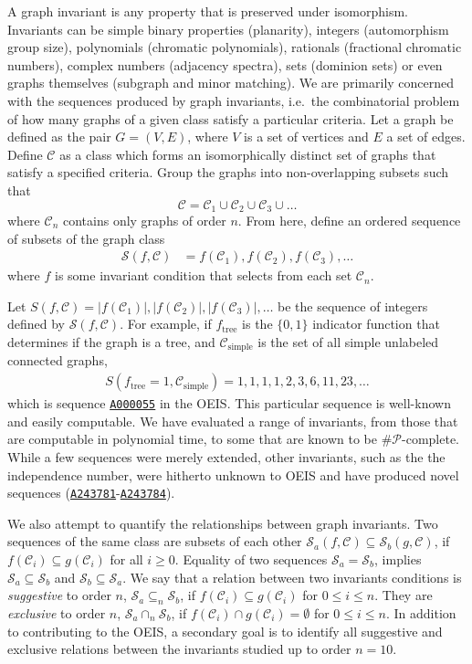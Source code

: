 \documentclass[12pt]{article}
\newcommand{\OEIS}[1]
{\href{https://oeis.org/#1}{\texttt{#1}}}
\newcommand{\SEQ}{\mathcal{S}}
\newcommand{\CLASS}{\mathcal{C}}
\newcommand{\SIMPLECLASS}{\mathcal{C}_\text{simple}}
\newcommand{\ie}[0]{i.e.\ }
\begin{document}
A graph invariant is any property that is preserved under isomorphism. 
Invariants can be simple binary properties (planarity), integers (automorphism group size), polynomials (chromatic polynomials), rationals (fractional chromatic numbers), complex numbers (adjacency spectra), sets (dominion sets) or even graphs themselves (subgraph and minor matching). 
We are primarily concerned with the sequences produced by graph invariants, \ie the combinatorial problem of how many graphs of a given class satisfy a particular criteria.
Let a graph be defined as the pair $G = (V,E)$, where $V$ is a set of vertices and $E$ a set of edges. 
Define $\CLASS$ as a class which forms an isomorphically distinct set of graphs that satisfy a specified criteria.
Group the graphs into non-overlapping subsets such that
\begin{equation}
\CLASS = \CLASS_1 \cup \CLASS_2 \cup \CLASS_3 \cup \ldots
\end{equation}
where $\CLASS_n$ contains only graphs of order $n$.
From here, define an ordered sequence of subsets of the graph class
%
\begin{align}
\SEQ(f, \CLASS) 
&= f(\CLASS_1), f(\CLASS_2), f(\CLASS_3), \ldots
\end{align}
%
where $f$ is some invariant condition that selects from each set $\CLASS_n$.

Let 
$S(f, \CLASS) = |f(\CLASS_1)|, |f(\CLASS_2)|, |f(\CLASS_3)|, \ldots$
be the sequence of integers defined by $\SEQ(f, \CLASS)$. 
For example, if $f_\text{tree}$ is the $\{0,1\}$ indicator function that determines if the graph is a tree, and $\SIMPLECLASS$ is the set of all simple unlabeled connected graphs,
%
\begin{align}
S(f_\text{tree}=1, \SIMPLECLASS) = 1, 1, 1, 1, 2, 3, 6, 11, 23, \ldots
\end{align}
%
which is sequence \OEIS{A000055} in the OEIS.
This particular sequence is well-known and easily computable.
We have evaluated a range of invariants, from those that are computable in polynomial time, to some that are known to be $\mathcal{\#P}$-complete.
While a few sequences were merely extended, other invariants, such as the the independence number, were hitherto unknown to OEIS and have produced novel sequences (\OEIS{A243781}-\OEIS{A243784}).

We also attempt to quantify the relationships between graph invariants.
Two sequences of the same class are subsets of each other $\SEQ_a(f,\CLASS) \subseteq \SEQ_b(g, \CLASS)$, if $f(\CLASS_i) \subseteq g(\CLASS_i)$ for all $i\ge0$. 
Equality of two sequences $\SEQ_a = \SEQ_b$, implies $\SEQ_a \subseteq \SEQ_b$ and $\SEQ_b \subseteq \SEQ_a$. 
We say that a relation between two invariants conditions is \textit{suggestive} to order $n$, $\SEQ_a \subseteq_n \SEQ_b$, if $f(\CLASS_i) \subseteq g(\CLASS_i)$ for $0 \le i \le n$.
They are \textit{exclusive} to order $n$, $\SEQ_a \cap_n \SEQ_b$, if $f(\CLASS_i) \cap g(\CLASS_i) = \emptyset$ for $0 \le i \le n$.
In addition to contributing to the OEIS, a secondary goal is to identify all suggestive and exclusive relations between the invariants studied up to order $n=10$.
\end{document}
